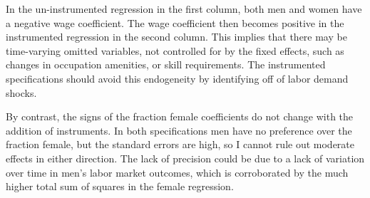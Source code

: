 \documentclass[12pt]{article}
\begin{document}
%
%
%
%
%
%
%
%
%
%
%
%



In the un-instrumented regression in the first column, both men and women have a negative wage coefficient. The wage coefficient then becomes positive in the instrumented regression in the second column. This implies that there may be time-varying omitted variables, not controlled for by the fixed effects, such as changes in occupation amenities, or skill requirements. The instrumented specifications should avoid this endogeneity by identifying off of labor demand shocks. 

By contrast, the signs of the fraction female coefficients do not change with the addition of instruments. In both specifications men have no preference over the fraction female, but the standard errors are high, so I cannot rule out moderate effects in either direction. The lack of precision could be due to a lack of variation over time in men's labor market outcomes, which is corroborated by the much higher total sum of squares in the female regression.









\end{document}
